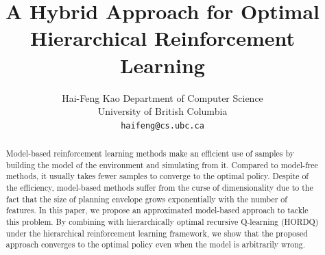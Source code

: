 \documentclass{article} %
\title{A Hybrid Approach for Optimal Hierarchical Reinforcement Learning}
\author{
Hai-Feng Kao
Department of Computer Science\\
University of British Columbia\\
\texttt{haifeng@cs.ubc.ca}
}
\begin{document}
\maketitle

\begin{abstract}
Model-based reinforcement learning methods make an efficient use of samples by 
building the model of the environment and simulating from it.
Compared to model-free methods, it usually takes fewer samples to converge to the optimal policy.
Despite of the efficiency, model-based methods
suffer from the curse of dimensionality due to the fact that
the size of planning envelope grows exponentially with the number 
of features. In this paper, we propose an approximated model-based
approach to tackle this problem. By combining with 
hierarchically optimal recursive Q-learning (HORDQ) under 
the hierarchical reinforcement learning framework, we show that
the proposed approach converges to the optimal policy even when
the model is arbitrarily wrong.
\end{abstract}
\end{document}

